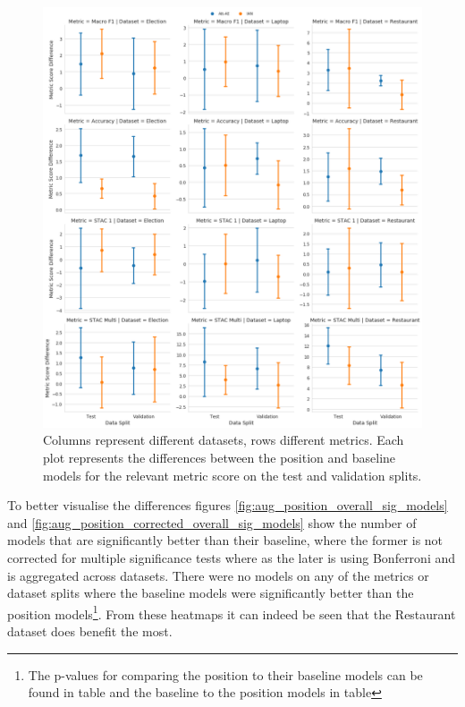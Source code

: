 
\begin{figure}[h!]
    \centering
    \includegraphics[scale=0.32]{images/augmentation/methods_performance/Position_Encoding/position_baseline_overall_differences.png}
    \caption{Columns represent different datasets, rows different metrics. Each plot represents the differences between the position and baseline models for the relevant metric score on the test and validation splits.}
    \label{fig:aug_position_baseline_overall_differences}
\end{figure}

To better visualise the differences figures \ref{fig:aug_position_overall_sig_models} and \ref{fig:aug_position_corrected_overall_sig_models} show the number of models that are significantly better than their baseline, where the former is not corrected for multiple significance tests where as the later is using Bonferroni and is aggregated across datasets. There were no models on any of the metrics or dataset splits where the baseline models were significantly better than the position models\footnote{The p-values for comparing the position to their baseline models can be found in table and the baseline to the position models in table}. From these heatmaps it can indeed be seen that the Restaurant dataset does benefit the most. 

